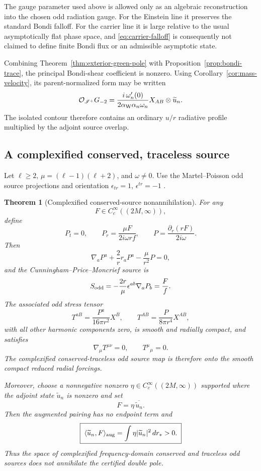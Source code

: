 \documentclass[11pt]{article}
\newtheorem{theorem}{Theorem}[section]
\theoremstyle{remark}
\begin{document}
The gauge parameter used above is allowed only as an algebraic
reconstruction into the chosen odd radiation gauge.  For the Einstein
line it preserves the standard Bondi falloff.  For the carrier line it is
large relative to the usual asymptotically flat phase space, and
\eqref{eq:carrier-falloff} is consequently not claimed to define finite
Bondi flux or an admissible asymptotic state.

Combining Theorem~\ref{thm:exterior-green-pole} with
Proposition~\ref{prop:bondi-trace}, the principal Bondi-shear coefficient
is nonzero.  Using Corollary~\ref{cor:mass-velocity}, its
parent-normalized form may be written
\[
 \mathcal O_{\mathscr I^+}G_{-2}
 =
 \frac{i\,\omega_n'(0)}
 {2\alpha_{\rm W}\alpha_n\omega_n}
 X_{AB}\otimes\widetilde u_n.
\]
The isolated contour therefore contains an ordinary \(u/r\) radiative
profile multiplied by the adjoint source overlap.

\subsection{A complexified conserved, traceless source}

Let \(\ell\ge2\), \(\mu=(\ell-1)(\ell+2)\), and \(\omega\ne0\).  Use the
Martel--Poisson odd source projections and orientation
\(\epsilon_{tr}=1\), \(\epsilon^{tr}=-1\) \cite{martelpoisson2005}.

\begin{theorem}[Complexified conserved-source nonannihilation]
\label{thm:source}
For any
\[
 F\in C_c^\infty((2M,\infty)),
\]
define
\[
 P_t=0,\qquad
 P_r=\frac{\mu F}{2i\omega rf},\qquad
 P=\frac{\partial_r(rF)}{2i\omega}.
\]
Then
\[
 \nabla_aP^a+\frac2r r_aP^a-\frac{\mu}{r^2}P=0,
\]
and the Cunningham--Price--Moncrief source is
\[
 S_{\rm odd}
 =-\frac{2r}{\mu}\epsilon^{ab}\nabla_aP_b
 =\frac{F}{f}.
\]
The associated odd stress tensor
\[
 T^{aB}=\frac{P^a}{16\pi r^2}X^B,\qquad
 T^{AB}=\frac{P}{8\pi r^4}X^{AB},
\]
with all other harmonic components zero, is smooth and radially compact,
and satisfies
\[
 \boxed{\;
 \nabla_\mu T^{\mu\nu}=0,\qquad
 T^\mu{}_\mu=0.
 \;}
\]
The complexified conserved-traceless odd source map is therefore onto the
smooth compact reduced radial forcings.

Moreover, choose a nonnegative nonzero
\(\eta\in C_c^\infty((2M,\infty))\) supported where the adjoint state
\(\widetilde u_n\) is nonzero and set
\[
 F=\eta\,\overline{\widetilde u_n}.
\]
Then the augmented pairing has no endpoint term and
\[
 \boxed{\;
 \langle\widetilde u_n,F\rangle_{\rm aug}
 =\int\eta|\widetilde u_n|^2\,dr_*>0.
 \;}
\]
Thus the space of complexified frequency-domain conserved and traceless
odd sources does not annihilate the certified double pole.
\end{theorem}
\end{document}
